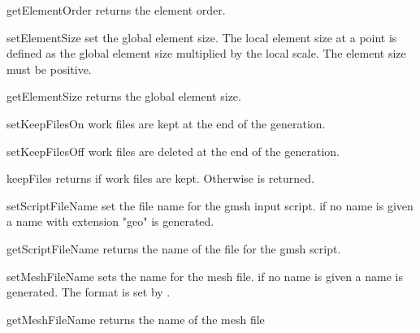 \begin{methoddesc}[Design]{getElementOrder}{}
returns the element order.
\end{methoddesc}

\begin{methoddesc}[Design]{setElementSize}{}
set the global element size. The local element size at a point is defined as 
the global element size multiplied by the local scale. The element size must be positive.
\end{methoddesc}


\begin{methoddesc}[Design]{getElementSize}{}
returns the global element size.
\end{methoddesc}



\begin{methoddesc}[Design]{setKeepFilesOn}{}
work files are kept at the end of the generation.
\end{methoddesc}

\begin{methoddesc}[Design]{setKeepFilesOff}{}
work files are deleted at the end of the generation.
\end{methoddesc}

\begin{methoddesc}[Design]{keepFiles}{}
returns \True if work files are kept. Otherwise \False is returned.
\end{methoddesc}

\begin{methoddesc}[Design]{setScriptFileName}{}
set the file name for the gmsh input script. if no name is given a name with extension "geo" is generated.
\end{methoddesc}

\begin{methoddesc}[Design]{getScriptFileName}{}
returns the name of the file for the gmsh script.
\end{methoddesc}


\begin{methoddesc}[Design]{setMeshFileName}{}
sets the name for the mesh file. if no name is given a name is generated.
The format is set by .
\end{methoddesc}

\begin{methoddesc}[Design]{getMeshFileName}{}
returns the name of the mesh file
\end{methoddesc}


